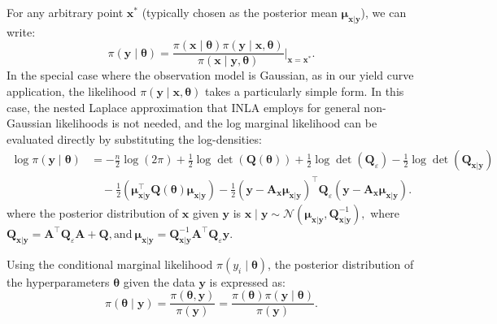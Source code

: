 \documentclass[
  12pt]{article}
\begin{document}
For any arbitrary point $\boldsymbol{x}^*$ (typically chosen as the posterior mean $\boldsymbol{\mu}_{\boldsymbol{x}|\boldsymbol{y}}$), we can write:
\[
\pi(\boldsymbol{y} \mid \boldsymbol{\theta}) = \frac{\pi(\boldsymbol{x} \mid \boldsymbol{\theta})\pi(\boldsymbol{y} \mid \boldsymbol{x}, \boldsymbol{\theta})}{\pi(\boldsymbol{x} \mid \boldsymbol{y}, \boldsymbol{\theta})}\bigg|_{\boldsymbol{x} = \boldsymbol{x}^*}.
\]
In the special case where the observation model is Gaussian, as in our yield curve application, the likelihood $\pi(\boldsymbol{y} \mid \boldsymbol{x}, \boldsymbol{\theta})$ takes a particularly simple form. In this case, the nested Laplace approximation that INLA employs for general non-Gaussian likelihoods is not needed, and the log marginal likelihood can be evaluated directly by substituting the log-densities:
\begin{align*}
\log \pi(\boldsymbol{y} \mid \boldsymbol{\theta}) &= -\frac{n}{2} \log(2\pi) 
+ \frac{1}{2} \log \det(\boldsymbol{Q}(\boldsymbol{\theta}))
+ \frac{1}{2} \log \det(\boldsymbol{Q}_\varepsilon)
- \frac{1}{2} \log \det(\boldsymbol{Q}_{\boldsymbol{x}|\boldsymbol{y}}) \\
&\quad - \frac{1}{2} (\boldsymbol{\mu}_{\boldsymbol{x}|\boldsymbol{y}}^\top \boldsymbol{Q}(\boldsymbol{\theta}) \boldsymbol{\mu}_{\boldsymbol{x}|\boldsymbol{y}})
- \frac{1}{2} (\boldsymbol{y} - \boldsymbol{A}_{\boldsymbol{x}} \boldsymbol{\mu}_{\boldsymbol{x}|\boldsymbol{y}})^\top \boldsymbol{Q}_\varepsilon (\boldsymbol{y} - \boldsymbol{A}_{\boldsymbol{x}} \boldsymbol{\mu}_{\boldsymbol{x}|\boldsymbol{y}}).
\end{align*}
where the posterior distribution of $\boldsymbol{x}$ given $\boldsymbol{y}$ is $\boldsymbol{x} \mid \boldsymbol{y} \sim \mathcal{N}(\boldsymbol{\mu}_{\boldsymbol{x}|\boldsymbol{y}}, \boldsymbol{Q}_{\boldsymbol{x}|\boldsymbol{y}}^{-1}),$
where $\boldsymbol{Q}_{\boldsymbol{x}|\boldsymbol{y}} = \boldsymbol{A}^\top \boldsymbol{Q}_\varepsilon \boldsymbol{A} + \boldsymbol{Q}, \text{and} \  \boldsymbol{\mu}_{\boldsymbol{x}|\boldsymbol{y}} = \boldsymbol{Q}_{\boldsymbol{x}|\boldsymbol{y}}^{-1} \boldsymbol{A}^\top \boldsymbol{Q}_\varepsilon \boldsymbol{y}.$

Using the conditional marginal likelihood $\pi(y_i \mid \boldsymbol{\theta})$, the posterior distribution of the hyperparameters $\boldsymbol{\theta}$ given the data $\boldsymbol{y}$ is expressed as:
\[
\pi(\boldsymbol{\theta} \mid \boldsymbol{y}) = \frac{\pi(\boldsymbol{\theta}, \boldsymbol{y})}{\pi(\boldsymbol{y})} = \frac{\pi(\boldsymbol{\theta})\pi(\boldsymbol{y} \mid \boldsymbol{\theta})}{\pi(\boldsymbol{y})}.
\]
\end{document}

